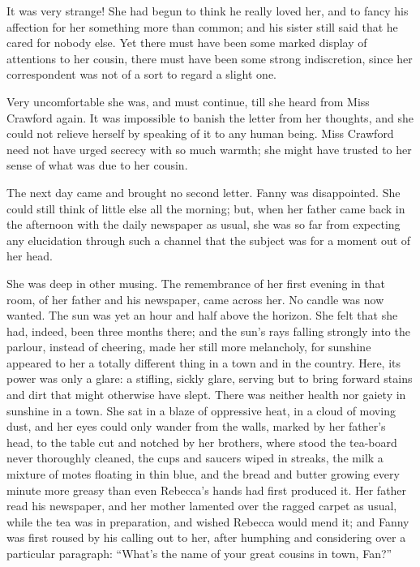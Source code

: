 \documentclass{article}
\begin{document}
It was very strange!  She had begun to think he really
loved her, and to fancy his affection for her something
more than common; and his sister still said that he cared
for nobody else.  Yet there must have been some marked
display of attentions to her cousin, there must have
been some strong indiscretion, since her correspondent
was not of a sort to regard a slight one.

Very uncomfortable she was, and must continue, till she
heard from Miss Crawford again.  It was impossible to
banish the letter from her thoughts, and she could not
relieve herself by speaking of it to any human being.
Miss Crawford need not have urged secrecy with so much warmth;
she might have trusted to her sense of what was due
to her cousin.

The next day came and brought no second letter.
Fanny was disappointed.  She could still think of little
else all the morning; but, when her father came back
in the afternoon with the daily newspaper as usual,
she was so far from expecting any elucidation through such
a channel that the subject was for a moment out of her head.

She was deep in other musing.  The remembrance of her first
evening in that room, of her father and his newspaper,
came across her.  No candle was now wanted.
The sun was yet an hour and half above the horizon.
She felt that she had, indeed, been three months there;
and the sun's rays falling strongly into the parlour,
instead of cheering, made her still more melancholy,
for sunshine appeared to her a totally different thing
in a town and in the country.  Here, its power was only
a glare:  a stifling, sickly glare, serving but to bring
forward stains and dirt that might otherwise have slept.
There was neither health nor gaiety in sunshine in a town.
She sat in a blaze of oppressive heat, in a cloud of
moving dust, and her eyes could only wander from the walls,
marked by her father's head, to the table cut and notched
by her brothers, where stood the tea-board never
thoroughly cleaned, the cups and saucers wiped in streaks,
the milk a mixture of motes floating in thin blue,
and the bread and butter growing every minute more
greasy than even Rebecca's hands had first produced it.
Her father read his newspaper, and her mother lamented
over the ragged carpet as usual, while the tea was
in preparation, and wished Rebecca would mend it;
and Fanny was first roused by his calling out to her,
after humphing and considering over a particular paragraph:
``What's the name of your great cousins in town, Fan?''
\end{document}
